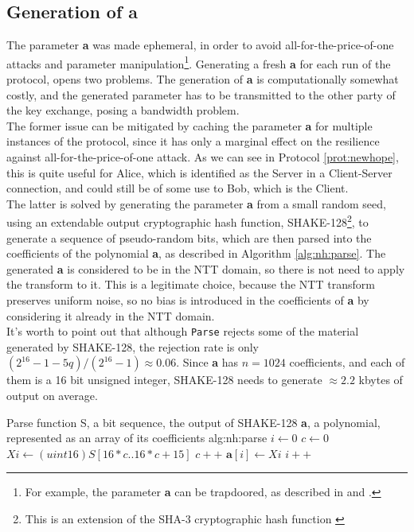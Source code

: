 \subsection{Generation of \textbf{a}}\label{sec:nh:a_generation}
The parameter \textbf{a} was made ephemeral, in order to avoid all-for-the-price-of-one attacks and parameter manipulation\footnote{For example, the parameter \textbf{a} can be trapdoored, as described in \cite{RLWE_trapdoor} and \cite{newhope}.}. Generating a fresh \textbf{a} for each run of the protocol, opens two problems. The generation of \textbf{a} is computationally somewhat costly, and the generated parameter has to be transmitted to the other party of the key exchange, posing a bandwidth problem.\\
The former issue can be mitigated by caching the parameter \textbf{a} for multiple instances of the protocol, since it has only a marginal effect on the resilience against all-for-the-price-of-one attack. As we can see in Protocol \ref{prot:newhope}, this is quite useful for Alice, which is identified as the Server in a Client-Server connection, and could still be of some use to Bob, which is the Client.\\
The latter is solved by generating the parameter \textbf{a} from a small random seed, using an extendable output cryptographic hash function, SHAKE-128\footnote{This is an extension of the SHA-3 cryptographic hash function \cite{SHA3_FIPS}}, to generate a sequence of pseudo-random bits, which are then parsed into the coefficients of the polynomial \textbf{a}, as described in Algorithm \ref{alg:nh:parse}. The generated \textbf{a} is considered to be in the NTT domain, so there is not need to apply the transform to it. This is a legitimate choice, because the NTT transform preserves uniform noise, so no bias is introduced in the coefficients of \textbf{a} by considering it already in the NTT domain.\\
It's worth to point out that although \verb|Parse| rejects some of the material generated by SHAKE-128, the rejection rate is only $(2^{16}-1-5q)/(2^{16}-1) \approx 0.06$. Since \textbf{a} has $n=1024$ coefficients, and each of them is a 16 bit unsigned integer, SHAKE-128 needs to generate $\approx 2.2$ kbytes of output on average.
\begin{b_algorithm}{Parse function}
{S, a bit sequence, the output of SHAKE-128}
{\textbf{a}, a polynomial, represented as an array of its coefficients}
{alg:nh:parse}
\STATE $i \gets 0$
\STATE $c \gets 0$
    \STATE $Xi \gets (uint16)S[16*c .. 16*c+15]$
    \STATE $c++$
        \STATE $\textbf{a}[i] \gets Xi$
        \STATE $i++$
    \ENDIF
\ENDWHILE
\end{b_algorithm}

